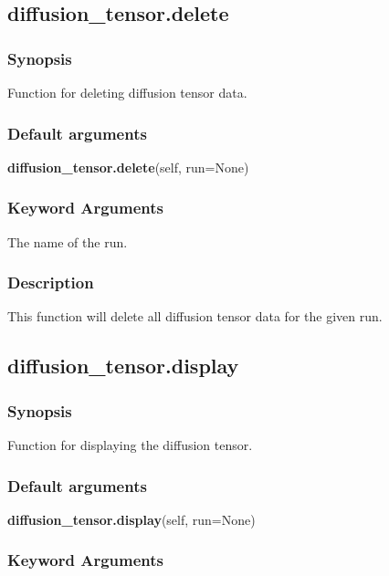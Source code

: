 \newpage

\subsection{diffusion\_tensor.delete}


\subsubsection{Synopsis}

Function for deleting diffusion tensor data.

\subsubsection{Default arguments}

\textsf{\textbf{diffusion\_tensor.delete}(self, run=None)}


\subsubsection{Keyword Arguments}

  The name of the run.

\subsubsection{Description}

This function will delete all diffusion tensor data for the given run.


\newpage

\subsection{diffusion\_tensor.display}


\subsubsection{Synopsis}

Function for displaying the diffusion tensor.

\subsubsection{Default arguments}

\textsf{\textbf{diffusion\_tensor.display}(self, run=None)}


\subsubsection{Keyword Arguments}

